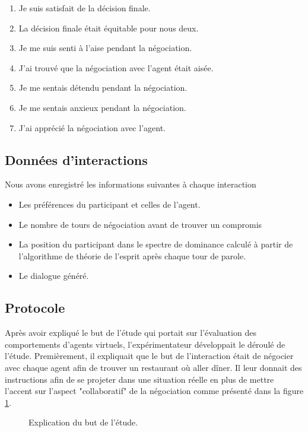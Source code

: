 \begin{enumerate}
	\item Je suis satisfait de la décision finale.
	\item La décision finale était équitable pour nous deux.
	\item Je me suis senti à l'aise pendant la négociation.
	\item J'ai trouvé que la négociation avec l'agent était aisée.
	\item Je me sentais détendu pendant la négociation.
	\item Je me sentais anxieux pendant la négociation.
	\item J'ai apprécié la négociation avec l'agent.
\end{enumerate}

\subsection{Données d'interactions}
Nous avons enregistré les informations suivantes à chaque interaction
\begin{itemize}
	\item Les préférences du participant et celles de l'agent.
	\item Le nombre de tours de négociation avant de trouver un compromis
	\item La position du participant dans le spectre de dominance calculé à partir de l'algorithme de théorie de l'esprit après chaque tour de parole.
	\item Le dialogue généré.
	
\end{itemize}


\subsection{Protocole}
Après avoir expliqué le but de l'étude qui portait sur l'évaluation des comportements d'agents virtuels, l'expérimentateur développait le déroulé de l'étude. 
Premièrement, il expliquait que le but de l'interaction était de négocier avec chaque agent afin de trouver un restaurant où aller dîner. Il leur donnait des instructions afin de se projeter dans une situation réelle en plus de mettre l'accent sur l'aspect "collaboratif" de la négociation comme présenté dans la figure \ref{fig:instruction}.

\begin{figure}[h]
		
		\caption{\label{fig:instruction}Explication du but de l'étude.}
	\end{figure}
	
